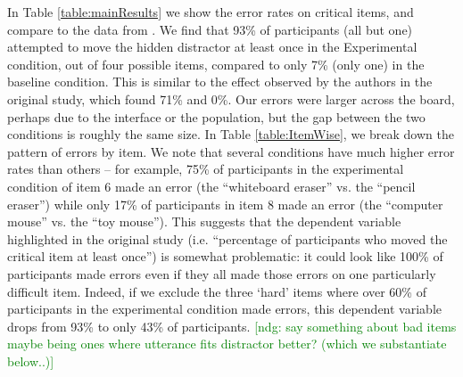 \documentclass[10pt,letterpaper]{article}
\newcommand{\ndg}[1]{\textcolor{Green}{[ndg: #1]}}
\begin{document}
In Table \ref{table:mainResults} we show the error rates on critical items, and compare to the data from
.
We find that 93\% of participants (all but one) attempted to move the hidden distractor at least once in the Experimental condition, out of four possible items, compared to only 7\% (only one) in the baseline condition. This is similar to the effect observed by the authors in the original study, which found 71\% and 0\%. Our errors were larger across the board, perhaps due to the interface or the population, but the gap between the two conditions is roughly the same size.
In Table \ref{table:ItemWise}, we break down the pattern of errors by item. 
We note that several conditions have much higher error rates than others -- for example, 75\% of participants in the experimental condition of item 6 made an error (the ``whiteboard eraser'' vs. the ``pencil eraser'') while only 17\% of participants in item 8 made an error (the ``computer mouse'' vs. the ``toy mouse''). 
This suggests that the dependent variable highlighted in the original study (i.e. ``percentage of participants who moved the critical item at least once'') is somewhat problematic: it could look like 100\% of participants made errors even if they all made those errors on one particularly difficult item. Indeed, if we exclude the three `hard' items where over 60\% of participants in the experimental condition made errors, this dependent variable drops from 93\% to only 43\% of participants. 
\ndg{say something about bad items maybe being ones where utterance fits distractor better? (which we substantiate below..)}
\end{document}

